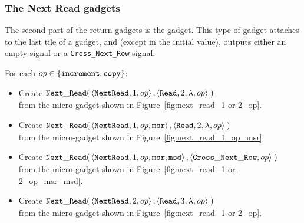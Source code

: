 \subsubsection{ The Next Read gadgets }

The second part of the return gadgets is the {\nextread} gadget. This type of gadget attaches to the last tile of a {\returnpath} gadget,
and (except in the initial value), outputs either an empty {\cread} signal or a {\tt Cross\_Next\_Row} signal.


For each $op\in \{ {\tt increment}, {\tt copy} \}$:
\begin{itemize}

    \item Create
    $\begin{aligned}[t]
        {\tt Next\_Read}(& \left\langle {\tt NextRead}, 1,          op \right\rangle,
                    \left\langle {\tt Read},     2, \lambda, op \right\rangle \;)
    \end{aligned}$\\from the micro-gadget shown in Figure~\ref{fig:next_read_1-or-2_op}.

    \item Create
    $\begin{aligned}[t]
        {\tt Next\_Read}(& \left\langle {\tt NextRead}, 1,          op, {\tt msr} \right\rangle,
                    \left\langle {\tt Read},     2, \lambda, op            \right\rangle \;)
    \end{aligned}$\\from the micro-gadget shown in Figure~\ref{fig:next_read_1_op_msr}.

    \item Create
    $\begin{aligned}[t]
        {\tt Next\_Read}(& \left\langle {\tt NextRead}, 1,      op, {\tt msr}, {\tt msd} \right\rangle,
                    \left\langle {\tt Cross\_Next\_Row}, op                       \right\rangle \;)
    \end{aligned}$\\from the micro-gadget shown in Figure~\ref{fig:next_read_1-or-2_op_msr_msd}.


    \item Create
    $\begin{aligned}[t]
        {\tt Next\_Read}(& \left\langle {\tt NextRead}, 2,          op \right\rangle,
                    \left\langle {\tt Read},     3, \lambda, op \right\rangle \;)
    \end{aligned}$\\from the micro-gadget shown in Figure~\ref{fig:next_read_1-or-2_op}.


\end{itemize}
